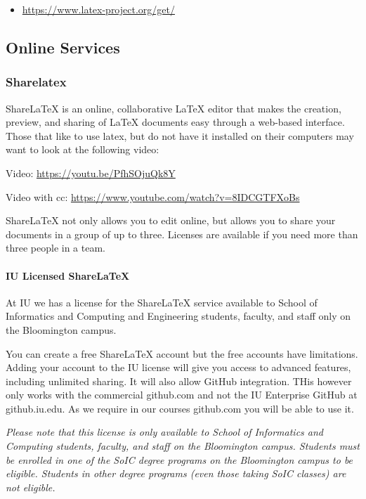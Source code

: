 \begin{itemize}

\item
  \url{https://www.latex-project.org/get/}
\end{itemize}

\subsection{Online Services}\label{online-services}

\subsubsection{Sharelatex}\label{sharelatex}

ShareLaTeX is an online, collaborative LaTeX editor that makes the
creation, preview, and sharing of LaTeX documents easy through a
web-based interface.  Those that like to use latex, but do not have it
installed on their computers may want to look at the following video:

Video: \url{https://youtu.be/PfhSOjuQk8Y}

Video with cc: \url{https://www.youtube.com/watch?v=8IDCGTFXoBs}

ShareLaTeX not only allows you to edit online, but allows you to share
your documents in a group of up to three. Licenses are available if you
need more than three people in a team.

\paragraph{IU Licensed ShareLaTeX}

At IU we has a license for the ShareLaTeX service available to School
of Informatics and Computing and Engineering students, faculty, and
staff only on the Bloomington campus.  

You can create a free ShareLaTeX account but the free accounts have
limitations.  Adding your account to the IU license will give you access
to advanced features, including unlimited sharing.  
It will also allow GitHub integration. THis however only works with
the commercial github.com and not the IU Enterprise GitHub at
github.iu.edu. As we require in our courses github.com you will be
able to use it.

{\em Please note that this license is only available to School of
Informatics and Computing students, faculty, and staff on the
Bloomington campus.  Students must be enrolled in one of the SoIC
degree programs on the Bloomington campus to be eligible.  Students in
other degree programs (even those taking SoIC classes) are not
eligible.}


